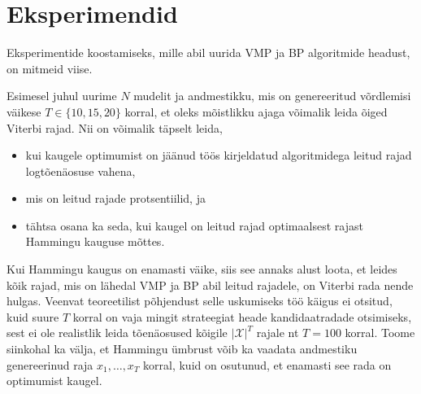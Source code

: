 \section{Eksperimendid}\label{sec:experiments}
Eksperimentide koostamiseks, mille abil uurida VMP ja BP algoritmide headust, on mitmeid viise. 

Esimesel juhul uurime $N$ mudelit ja andmestikku, mis on genereeritud võrdlemisi väikese $T \in \{10,15,20\}$ korral, et oleks mõistlikku ajaga võimalik leida õiged Viterbi rajad. Nii on võimalik täpselt leida,
\begin{itemize}
    \item kui kaugele optimumist on jäänud töös kirjeldatud algoritmidega leitud rajad logtõenäosuse vahena,
    \item mis on leitud rajade protsentiilid, ja
    \item tähtsa osana ka seda, kui kaugel on leitud rajad optimaalsest rajast Hammingu kauguse mõttes.
\end{itemize}
Kui Hammingu kaugus on enamasti väike, siis see annaks alust loota, et leides kõik rajad, mis on lähedal VMP ja BP abil leitud rajadele, on Viterbi rada nende hulgas. Veenvat teoreetilist põhjendust selle uskumiseks töö käigus ei otsitud, kuid suure $T$ korral on vaja mingit strateegiat heade kandidaatradade otsimiseks, sest ei ole realistlik leida tõenäosused kõigile $|\mathcal{X}|^T$ rajale nt $T=100$ korral. Toome siinkohal ka välja, et Hammingu ümbrust võib ka vaadata andmestiku genereerinud raja $x_1,\ldots,x_T$ korral, kuid on osutunud, et enamasti see rada on optimumist kaugel.

